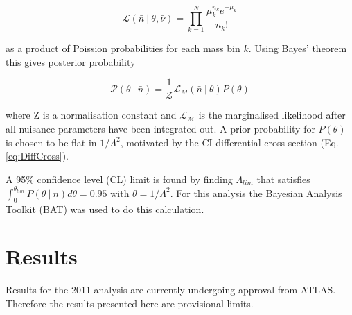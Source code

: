 \begin{equation}
        \mathcal{L} (\bar{n}~|~\theta,\bar{\nu}) = \prod_{k=1}^{N} \frac{ \mu_{k}^{n_{k}} e^{-\mu_{k}} }{n_{k}!}
\end{equation}

as a product of Poission probabilities for each mass bin $k$. Using Bayes' theorem this gives posterior probability

\begin{equation}
        \mathcal{P}(\theta~|~\bar{n}) = \frac{1}{\mathcal{Z}} \mathcal{L}_{M}(\bar{n}~|~\theta)P(\theta)
\end{equation}

where Z is a normalisation constant and $\mathcal{L_{M}}$ is the marginalised likelihood after all nuisance parameters have been integrated out. A prior probability for $P(\theta)$ is chosen to be flat in $1/\Lambda^{2}$, motivated by the CI differential cross-section (Eq. \ref{eq:DiffCross}).

A 95\% confidence level (CL) limit is found by finding $\Lambda_{lim}$ that satisfies $\int_{0} ^{\theta_{lim}} P(\theta~|~\bar{n}) d\theta = 0.95$ with $\theta = 1/\Lambda^{2}$. For this analysis the Bayesian Analysis Toolkit (BAT) \cite{BAT} was used to do this calculation. 









\section{Results}
Results for the 2011 analysis are currently undergoing approval from ATLAS. Therefore the results presented here are provisional limits. 

